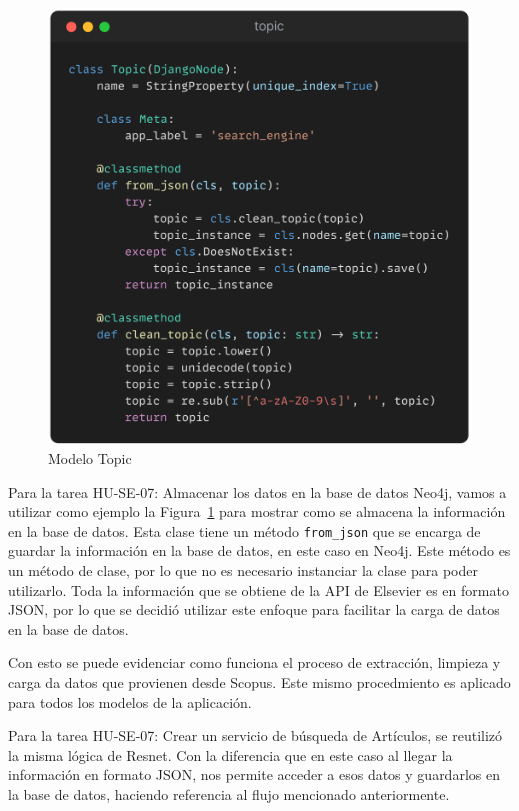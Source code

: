 \begin{figure}[H]
    \centering
    \includegraphics[scale=0.11]{../02Figures/02Chapter/Sprints/Sprint-5/topic-model.png}
    \caption{Modelo Topic}\label{fig:topic-model}
\end{figure}

Para la tarea HU-SE-07: Almacenar los datos en la base de datos Neo4j,
vamos a utilizar como ejemplo la Figura~\ref{fig:topic-model} para mostrar como se almacena la información en la base de datos.
Esta clase tiene un método \texttt{from\_json} que se encarga de guardar la información en la base de datos, en este caso en Neo4j.
Este método es un método de clase, por lo que no es necesario instanciar la clase para poder utilizarlo.
Toda la información que se obtiene de la API de Elsevier es en formato JSON, por lo que se decidió
utilizar este enfoque para facilitar la carga de datos en la base de datos.

Con esto se puede evidenciar como funciona el proceso de extracción, limpieza y carga da datos que provienen desde Scopus.
Este mismo procedmiento es aplicado para todos los modelos de la aplicación.

Para la tarea HU-SE-07: Crear un servicio de búsqueda de Artículos, se reutilizó la misma lógica de Resnet.
Con la diferencia que en este caso al llegar la información en formato JSON, nos permite acceder a esos datos
y guardarlos en la base de datos, haciendo referencia al flujo mencionado anteriormente.

